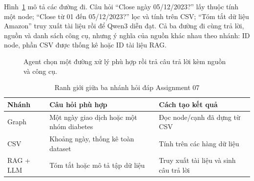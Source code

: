 \documentclass[12pt,a4paper]{report}
\begin{document}
Hình~\ref{fig:essay03-agent-flow} mô tả các đường đi. Câu hỏi ``Close ngày 05/12/2023?'' lấy thuộc tính một node; ``Close từ 01 đến 05/12/2023?'' lọc và tính trên CSV; ``Tóm tắt dữ liệu Amazon'' truy xuất tài liệu rồi để Qwen3 diễn đạt. Cả ba đường đi cùng trả lời, nguồn và danh sách công cụ, nhưng ý nghĩa của nguồn khác nhau theo nhánh: ID node, phần CSV được thống kê hoặc ID tài liệu RAG.
\begin{figure}[htbp]\centering
{}
\caption{Agent chọn một đường xử lý phù hợp rồi trả câu trả lời kèm nguồn và công cụ.}\label{fig:essay03-agent-flow}
\end{figure}

\begin{table}[htbp]\centering
\caption{Ranh giới giữa ba nhánh hỏi đáp Assignment 07}\label{tab:essay03-agent}
\begin{tabularx}{\textwidth}{>{\raggedright\arraybackslash}p{2.4cm}>{\raggedright\arraybackslash}X>{\raggedright\arraybackslash}X}
\toprule
\textbf{Nhánh} & \textbf{Câu hỏi phù hợp} & \textbf{Cách tạo kết quả}\\
\midrule
Graph & Một ngày giao dịch hoặc một nhóm diabetes & Đọc node/cạnh đã dựng từ CSV\\
CSV & Khoảng ngày, thống kê toàn dataset & Tính trên các hàng dữ liệu\\
RAG + LLM & Tóm tắt hoặc mô tả tập dữ liệu & Truy xuất tài liệu và sinh câu trả lời\\
\bottomrule
\end{tabularx}
\end{table}
\end{document}
